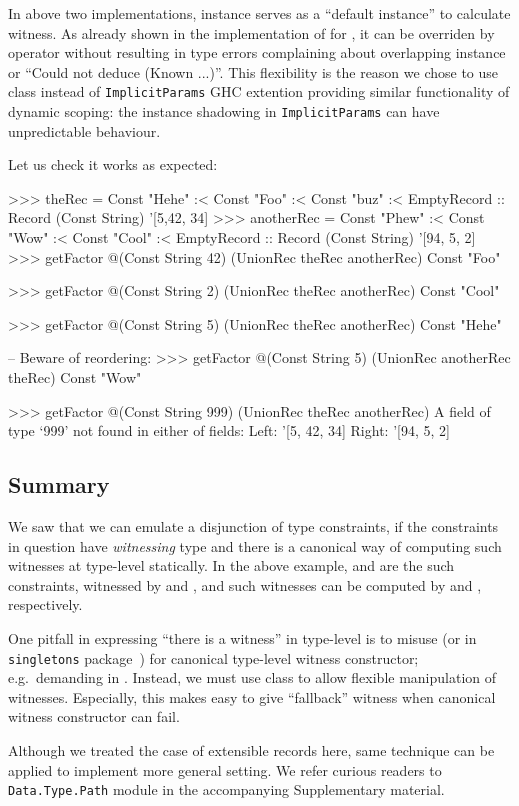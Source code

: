 \documentclass[demotion-paper.tex]{subfiles}
\begin{document}
In above two implementations,  instance serves as a ``default instance'' to calculate witness.
As already shown in the implementation of  for , it can be overriden by  operator without resulting in type errors complaining about overlapping instance or ``Could not deduce (Known ...)''.
This flexibility is the reason we chose to use  class instead of \texttt{ImplicitParams} GHC extention providing similar functionality of dynamic scoping:  the instance shadowing in \texttt{ImplicitParams} can have unpredictable behaviour.

Let us check it works as expected:

\begin{repl}
>>> theRec = Const "Hehe" :< Const "Foo" :< Const "buz" :< EmptyRecord
      :: Record (Const String) '[5,42, 34]
>>> anotherRec = Const "Phew" :< Const "Wow" :< Const "Cool" :< EmptyRecord
      :: Record (Const String) '[94, 5, 2]
>>> getFactor @(Const String 42) (UnionRec theRec anotherRec)
Const "Foo"

>>> getFactor @(Const String 2) (UnionRec theRec anotherRec)
Const "Cool"

>>> getFactor @(Const String 5) (UnionRec theRec anotherRec)
Const "Hehe"

-- Beware of reordering:
>>> getFactor @(Const String 5) (UnionRec anotherRec theRec)
Const "Wow"

>>> getFactor @(Const String 999) (UnionRec theRec anotherRec)
A field of type `999' not found in either of fields:
   Left: '[5, 42, 34]
  Right: '[94, 5, 2]  
\end{repl}

\subsection{Summary}
We saw that we can emulate a disjunction of type constraints, if the constraints in question have \emph{witnessing} type and there is a canonical way of computing such witnesses at type-level statically.
In the above example,  and  are the such constraints, witnessed by  and , and such witnesses can be computed by  and , respectively.

One pitfall in expressing ``there is a witness'' in type-level is to misuse  (or  in \texttt{singletons} package~\cite{singletons}) for canonical type-level witness constructor; e.g.\ demanding  in .
Instead, we must use  class to allow flexible manipulation of witnesses.
Especially, this makes easy to give ``fallback'' witness when canonical witness constructor can fail.

Although we treated the case of extensible records here, same technique can be applied to implement more general setting.
We refer curious readers to \texttt{Data.Type.Path} module in the accompanying Supplementary material. 
\end{document}
